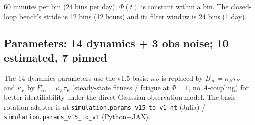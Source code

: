 \documentclass[11pt,a4paper]{article}
\begin{document}
60 minutes per bin (24 bins per day); $\Phi(t)$ is constant within a
bin. The closed-loop bench's stride is 12 bins (12 hours) and its
filter window is 24 bins (1 day).

\subsection{Parameters: 14 dynamics + 3 obs noise; 10 estimated, 7 pinned}

The 14 dynamics parameters use the v1.5 basis: $\kappa_B$ is replaced
by $B_\infty = \kappa_B \tau_B$ and $\kappa_F$ by
$F_\infty = \kappa_F \tau_F$ (steady-state fitness / fatigue at
$\Phi = 1$, no $A$-coupling) for better identifiability under the
direct-Gaussian observation model. The basis-rotation adapter is at
\texttt{simulation.params\_v15\_to\_v1\_nt} (Julia) /
\texttt{simulation.params\_v15\_to\_v1} (Python+JAX).
\end{document}
